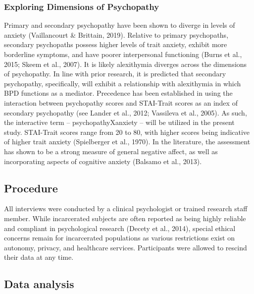 \documentclass[
  man,floatsintext]{apa7}
\begin{document}
\hypertarget{exploring-dimensions-of-psychopathy}{%
\subsubsection{Exploring Dimensions of Psychopathy}\label{exploring-dimensions-of-psychopathy}}

Primary and secondary psychopathy have been shown to diverge in levels of anxiety (Vaillancourt \& Brittain, 2019). Relative to primary psychopaths, secondary psychopaths possess higher levels of trait anxiety, exhibit more borderline symptoms, and have poorer interpersonal functioning (Burns et al., 2015; Skeem et al., 2007). It is likely alexithymia diverges across the dimensions of psychopathy. In line with prior research, it is predicted that secondary psychopathy, specifically, will exhibit a relationship with alexithymia in which BPD functions as a mediator. Precedence has been established in using the interaction between psychopathy scores and STAI-Trait scores as an index of secondary psychopathy (see Lander et al., 2012; Vassileva et al., 2005). As such, the interactive term -- psychopathyXanxiety -- will be utilized in the present study. STAI-Trait scores range from 20 to 80, with higher scores being indicative of higher trait anxiety (Spielberger et al., 1970). In the literature, the assessment has shown to be a strong measure of general negative affect, as well as incorporating aspects of cognitive anxiety (Balsamo et al., 2013).

\hypertarget{procedure}{%
\subsection{Procedure}\label{procedure}}

All interviews were conducted by a clinical psychologist or trained research staff member. While incarcerated subjects are often reported as being highly reliable and compliant in psychological research (Decety et al., 2014), special ethical concerns remain for incarcerated populations as various restrictions exist on autonomy, privacy, and healthcare services. Participants were allowed to rescind their data at any time.

\hypertarget{data-analysis}{%
\subsection{Data analysis}\label{data-analysis}}
\end{document}
